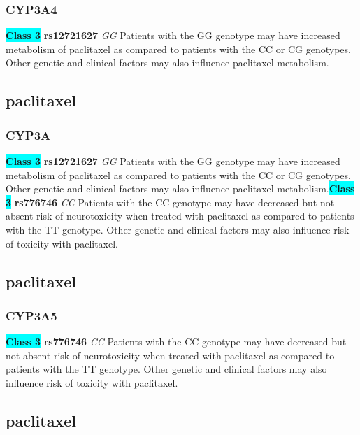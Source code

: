 \documentclass{book}
\begin{document}
\subsubsection{ CYP3A4 }

\begin{center}
\textbf{\colorbox{cyan} {Class 3}} \textbf{ rs12721627 } \textit{ GG }
Patients with the GG genotype may have increased metabolism of paclitaxel as compared to patients with the CC or CG genotypes. Other genetic and clinical factors may also influence paclitaxel metabolism.


\end{center}\subsection{ paclitaxel }


\subsubsection{ CYP3A }

\begin{center}
\textbf{\colorbox{cyan} {Class 3}} \textbf{ rs12721627 } \textit{ GG }
Patients with the GG genotype may have increased metabolism of paclitaxel as compared to patients with the CC or CG genotypes. Other genetic and clinical factors may also influence paclitaxel metabolism.\textbf{\colorbox{cyan} {Class 3}} \textbf{ rs776746 } \textit{ CC }
Patients with the CC genotype may have decreased but not absent risk of neurotoxicity when treated with paclitaxel as compared to patients with the TT genotype. Other genetic and clinical factors may also influence risk of toxicity with paclitaxel.


\end{center}\subsection{ paclitaxel }


\subsubsection{ CYP3A5 }

\begin{center}
\textbf{\colorbox{cyan} {Class 3}} \textbf{ rs776746 } \textit{ CC }
Patients with the CC genotype may have decreased but not absent risk of neurotoxicity when treated with paclitaxel as compared to patients with the TT genotype. Other genetic and clinical factors may also influence risk of toxicity with paclitaxel.


\end{center}\subsection{ paclitaxel }
\end{document}
